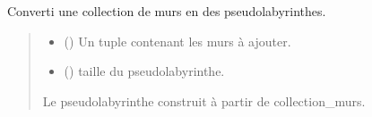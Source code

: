 \documentclass[letterpaper,10pt,french]{sphinxmanual}
\begin{document}
\begin{fulllineitems}
\label{\detokenize{src:src.algorithmes_docs.murs_to_PseudoLabyrinthe}}
\pysigstartsignatures
{}
\pysigstopsignatures
\sphinxAtStartPar
Converti une collection de murs en des pseudo\sphinxhyphen{}labyrinthes.
\begin{quote}\begin{description}
\begin{itemize}
\item {} 
\sphinxAtStartPar
{} () \textendash{} Un tuple contenant les murs à ajouter.

\item {} 
\sphinxAtStartPar
{} () \textendash{} taille du pseudo\sphinxhyphen{}labyrinthe.

\end{itemize}

\sphinxAtStartPar
Le pseudo\sphinxhyphen{}labyrinthe construit à partir de collection\_murs.

\sphinxAtStartPar
{\hyperref[\detokenize{src:src.utilites.PseudoLabyrinthe}]{}}

\end{description}\end{quote}

\end{fulllineitems}

\end{document}
